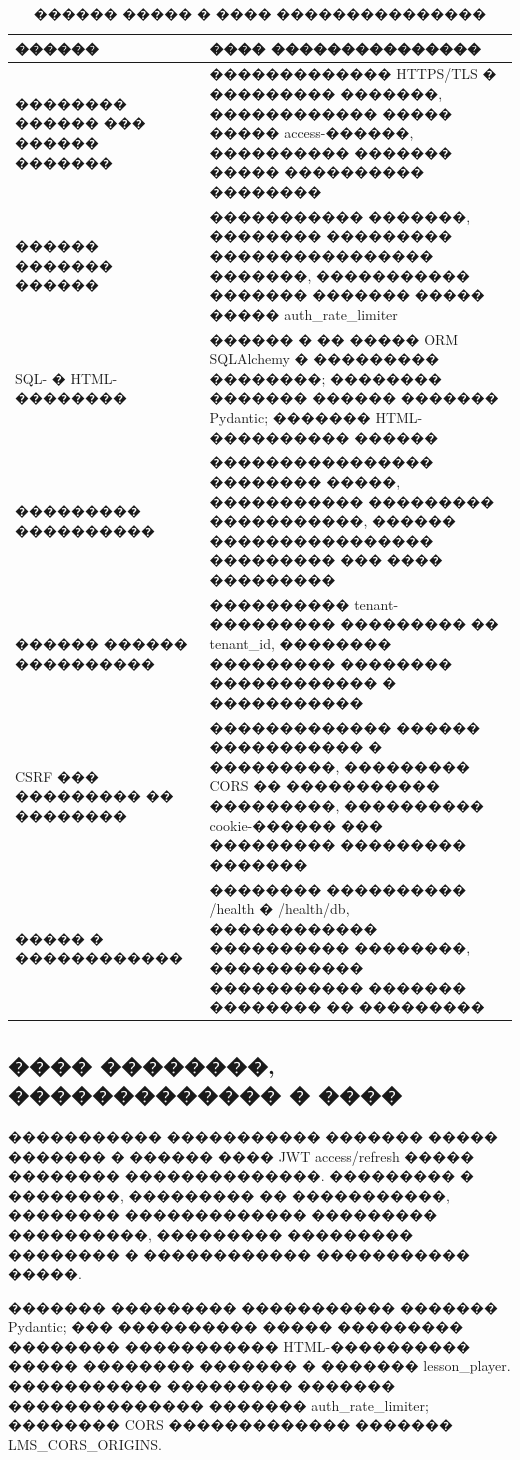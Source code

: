 \begin{table}[p]
\centering
\caption{������ ����� � ���� ���������������}
\label{tab:ch3-threat-controls}
{\fontsize{11pt}{13pt}\selectfont
\setlength{\tabcolsep}{3pt}
\begin{tabularx}{\textwidth}{|>{\RaggedRight\arraybackslash}p{45mm}|>{\RaggedRight\arraybackslash}X|}
\hline
������ & ���� ��������������� \\
\hline
�������� ������ ��� ������ ������� & ������������� HTTPS/TLS � ��������� �������, ������������ ����� ����� access-������, ���������� ������� ����� ���������� �������� \\
\hline
������ ������� ������ & ����������� �������, �������� ��������� ���������������� �������, ����������� ������� ������� ����� ����� auth\_rate\_limiter \\
\hline
SQL- � HTML-�������� & ������ � �� ����� ORM SQLAlchemy � ��������� ��������; �������� ������� ������ ������� Pydantic; ������� HTML-���������� ������ \\
\hline
��������� ���������� & ���������������� �������� �����, ����������� ��������� �����������, ������ ���������������� ��������� ��� ���� ��������� \\
\hline
������ ������ ���������� & ���������� tenant-��������� ��������� �� tenant\_id, �������� ��������� �������� ������������ � ����������� \\
\hline
CSRF ��� ��������� �� �������� & ������������� ������ ����������� � ���������, ��������� CORS �� ����������� ���������, ���������� cookie-������ ��� ��������� ��������� ������� \\
\hline
����� � ������������ & �������� ���������� /health � /health/db, ������������ ���������� ��������, ����������� ����������� ������� �������� �� ��������� \\
\hline
\end{tabularx}
}
\end{table}

\subsection{���� ��������, ������������� � ����}

����������� ����������� ������� ����� ������� � ������ ���� JWT access/refresh ����� �������� ��������������. ��������� � ��������, ��������� �� �����������, �������� ������������� ��������� ����������, ��������� ��������� �������� � ������������ ����������� �����.

������� ��������� ����������� ������� Pydantic; ��� ���������� ����� ��������� �������� ����������� HTML-���������� ����� �������� ������� � ������� lesson\_player. ����������� ��������� ������� �������������� ������� auth\_rate\_limiter; �������� CORS ������������� ������� LMS\_CORS\_ORIGINS.

